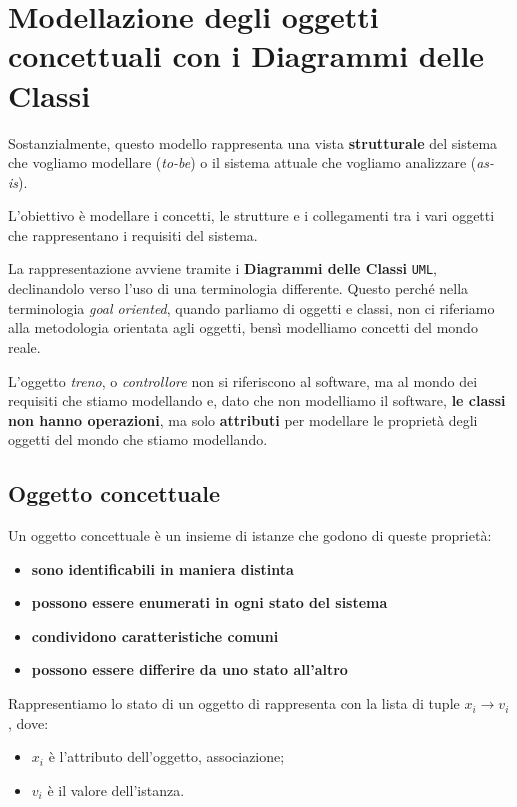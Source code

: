 \chapter{Modellazione degli oggetti concettuali con i Diagrammi delle Classi}
Sostanzialmente, questo modello rappresenta una vista \textbf{strutturale} del sistema che
vogliamo modellare (\textit{to-be}) o il sistema attuale che vogliamo analizzare 
(\textit{as-is}).

L'obiettivo è modellare i concetti, le strutture e i collegamenti tra i vari 
oggetti che rappresentano i requisiti del sistema.

La rappresentazione avviene tramite i \textbf{Diagrammi delle Classi} \texttt{UML}, declinandolo 
verso l'uso di una terminologia differente. Questo perché nella terminologia 
\textit{goal oriented}, quando parliamo di oggetti e classi, non ci riferiamo alla 
metodologia orientata agli oggetti, bensì modelliamo concetti del mondo reale.

L'oggetto \textit{treno}, o \textit{controllore} non si riferiscono al software, ma al mondo dei 
requisiti che stiamo modellando e, dato che non modelliamo il
software, \textbf{le classi non hanno operazioni}, ma solo \textbf{attributi} per modellare 
le proprietà degli oggetti del mondo che stiamo modellando.

\section{Oggetto concettuale}
\label{sec:oggetto_concettuale}
\begin{tcolorbox}[colback=violet!5!white,colframe=violet!75!black, title=Oggetto concettuale]
    Un oggetto concettuale è un insieme di istanze che godono di queste proprietà:
    \begin{itemize}
        \item \textbf{sono identificabili in maniera distinta}
        \item \textbf{possono essere enumerati in ogni stato del sistema}
        \item \textbf{condividono caratteristiche comuni}
        \item \textbf{possono essere differire da uno stato all'altro}
    \end{itemize}
\end{tcolorbox}
Rappresentiamo lo stato di un oggetto di rappresenta con la lista di tuple $x_i \rightarrow v_i$,
dove:
\begin{itemize}
    \item $x_i$ è l'attributo dell'oggetto, associazione;
    \item $v_i$ è il valore dell'istanza.
\end{itemize}
